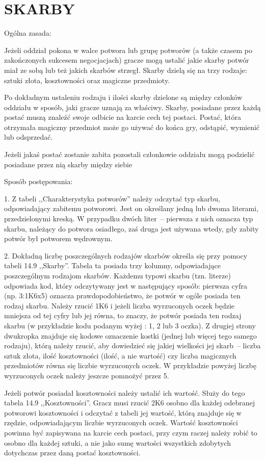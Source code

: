 \section{SKARBY}

Ogólna zasada:

Jeżeli oddział pokona w walce potwora lub grupę potworów (a także czasem po zakończonych sukcesem negocjacjach) gracze mogą ustalić jakie skarby potwór miał ze sobą lub też jakich skarbów strzegł.
Skarby dzielą się na trzy rodzaje: sztuki złota, kosztowności oraz magiczne przedmioty.

Po dokładnym ustaleniu rodzaju i ilości skarby dzielone są między członków oddziału w sposób, jaki gracze uznają za właściwy.
Skarby, posiadane przez każdą postać muszą znaleźć swoje odbicie na karcie cech tej postaci.
Postać, która otrzymała magiczny przedmiot może go używać do końca gry, odstąpić, wymienić lub odsprzedać.

Jeżeli jakaś postać zostanie zabita pozostali członkowie oddziału mogą podzielić posiadane przez nią skarby między siebie

Sposób postępowania:

1. Z tabeli ,,Charakterystyka potworów'' należy odczytać typ skarbu, odpowiadający zabitemu potworowi.
Jest on określany jedną lub dwoma literami, przedzielonymi kreską.
W przypadku dwóch liter~-- pierwsza z nich oznacza typ skarbu, należący do potwora osiadłego, zaś druga jest używana wtedy, gdy zabity potwór był potworem wędrownym.

2. Dokładną liczbę poszczególnych rodzajów skarbów określa się przy pomocy tabeli 14.9 ,,Skarby''.
Tabela ta posiada trzy kolumny, odpowiadające poszczególnym rodzajom skarbów.
Każdemu typowi skarbu (tzn. literze) odpowiada kod, który odczytywany jest w następujący sposób: pierwsza cyfra (np. 3:1K6x5) oznacza prawdopodobieństwo, że potwór w ogóle posiada ten rodzaj skarbu.
Należy rzucić 1K6 i jeżeli liczba wyrzuconych oczek będzie mniejsza od tej cyfry lub jej równa, to znaczy, że potwór posiada ten rodzaj skarbu (w przykładzie kodu podanym wyżej : 1, 2 lub 3 oczka).
Z drugiej strony dwukropka znajduje się kodowe oznaczenie kostki (jednej lub więcej tego samego rodzaju), którą należy rzucić, aby dowiedzieć się jakiej wielkości jej skarb~-- liczba sztuk złota, ilość kosztowności (ilość, a nie wartość) czy liczba magicznych przedmiotów równa się liczbie wyrzuconych oczek.
W przykładzie powyżej liczbę wyrzuconych oczek należy jeszcze pomnożyć przez 5.

Jeżeli potwór posiadał kosztowności należy ustalić ich wartość.
Służy do tego tabela 14.9 ,,Kosztowności''.
Gracz musi rzucić 2K6 osobno dla każdej odebranej potworowi kosztowności i odczytać z tabeli jej wartość, którą znajduje się w rzędzie, odpowiadającym liczbie wyrzuconych oczek.
Wartość kosztowności powinna być zapisywana na karcie cech postaci, przy czym raczej należy robić to osobno dla każdej sztuki, a nie jako sumę wartości wszystkich zdobytych dotychczas przez daną postać kosztowności.

